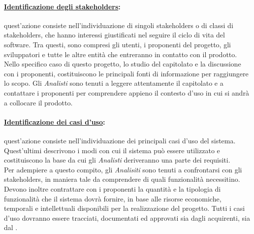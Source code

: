 \paragraph{\underline{Identificazione degli stakeholders}:} quest'azione consiste nell'individuazione di singoli stakeholders o di classi di stakeholders, che hanno interessi giustificati nel seguire il ciclo di vita del software. Tra questi, sono compresi gli utenti, i proponenti del progetto, gli sviluppatori e tutte le altre entità che entreranno in contatto con il prodotto.\\
Nello specifico caso di questo progetto, lo studio del capitolato e la discussione con i proponenti, costituiscono le principali fonti di informazione per raggiungere lo scopo. Gli \textit{Analisti} sono tenuti a leggere attentamente il capitolato e a contattare i proponenti per comprendere appieno il contesto d'uso in cui si andrà a collocare il prodotto.

\paragraph{\underline{Identificazione dei casi d'uso}:} quest'azione consiste nell'individuazione dei principali casi d'uso del sistema. Quest'ultimi descrivono i modi con cui il sistema può essere utilizzato e costituiscono la base da cui gli \textit{Analisti} deriveranno una parte dei requisiti.\\
Per adempiere a questo compito, gli \textit{Analisiti} sono tenuti a confrontarsi con gli stakeholders, in maniera tale da comprendere di quali funzionalità necessitino. Devono inoltre contrattare con i proponenti la quantità e la tipologia di funzionalità che il sistema dovrà fornire, in base alle risorse economiche, temporali e intellettuali disponibili per la realizzazione del progetto. Tutti i casi d'uso dovranno essere tracciati, documentati ed approvati sia dagli acquirenti, sia dal \projectManager{}.

